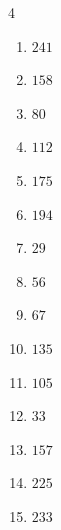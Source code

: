 \begin{multicols}{4}
\begin{enumerate}

  \item $241$


  \item $158$


  \item $80$


  \item $112$


  \item $175$


  \item $194$


  \item $29$


  \item $56$


  \item $67$


  \item $135$


  \item $105$


  \item $33$


  \item $157$


\columnbreak %

  \item $225$


  \item $233$



\end{enumerate}
\end{multicols}

